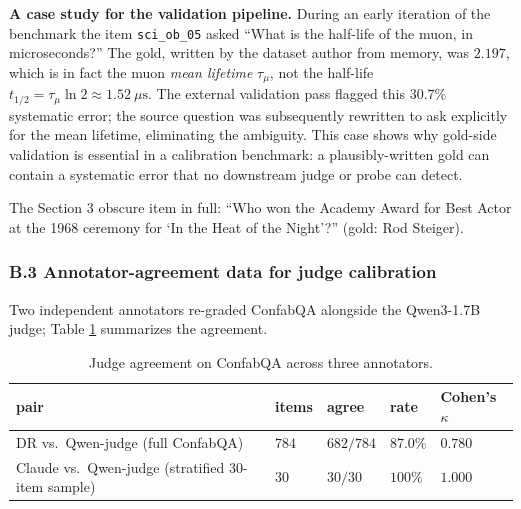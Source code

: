 \textbf{A case study for the validation pipeline.} During an early
iteration of the benchmark the item \texttt{sci\_ob\_05} asked ``What is
the half-life of the muon, in microseconds?'' The gold, written by the
dataset author from memory, was \(2.197\), which is in fact the muon
\emph{mean lifetime} \(\tau_\mu\), not the half-life
\(t_{1/2} = \tau_\mu \ln 2 \approx 1.52\ \mu\text{s}\). The external
validation pass flagged this \(30.7\%\) systematic error; the source
question was subsequently rewritten to ask explicitly for the mean
lifetime, eliminating the ambiguity. This case shows why gold-side validation is essential in a calibration
benchmark: a plausibly-written gold can contain a systematic error that
no downstream judge or probe can detect.

The Section 3 obscure item in full: ``Who won the Academy Award for
Best Actor at the 1968 ceremony for `In the Heat of the Night'?''
(gold: Rod Steiger).

\subsubsection{B.3 Annotator-agreement data for judge
calibration}\label{b.3-annotator-agreement-data-for-judge-calibration}

Two independent annotators re-graded ConfabQA alongside the Qwen3-1.7B
judge; Table \ref{tbl:judge} summarizes the agreement.

\begin{table}[!htbp]
\small
\centering
\caption{Judge agreement on ConfabQA across three
annotators.\label{tbl:judge}}
\begin{tabular}{@{}
  >{\raggedright\arraybackslash}p{}
  >{\raggedleft\arraybackslash}p{}
  >{\raggedleft\arraybackslash}p{}
  >{\raggedleft\arraybackslash}p{}
  >{\raggedleft\arraybackslash}p{}@{}}
\toprule
\begin{minipage}[b]{\linewidth}\raggedright
pair
\end{minipage} & \begin{minipage}[b]{\linewidth}\raggedleft
items
\end{minipage} & \begin{minipage}[b]{\linewidth}\raggedleft
agree
\end{minipage} & \begin{minipage}[b]{\linewidth}\raggedleft
rate
\end{minipage} & \begin{minipage}[b]{\linewidth}\raggedleft
Cohen's \(\kappa\)
\end{minipage} \\\midrule
DR vs.~Qwen-judge (full ConfabQA) & \(784\) & \(682 / 784\) & \(87.0\%\)
& \(0.780\) \\
Claude vs.~Qwen-judge (stratified 30-item sample) & \(30\) & \(30 / 30\)
& \(100\%\) & \(1.000\) \\
\bottomrule
\end{tabular}
\end{table}

